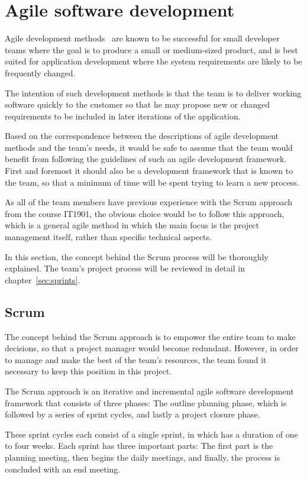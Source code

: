 \section{Agile software development}

Agile development methods~\cite{scrum} are known to be successful for small developer teams where the goal is to produce a small or medium-sized product, and is best suited for application development where the system requirements are likely to be frequently changed.

The intention of such development methods is that the team is to deliver working software quickly to the customer so that he may propose new or changed requirements to be included in later iterations of the application.

Based on the correspondence between the descriptions of agile development methods and the team's needs, it would be safe to assume that the team would benefit from following the guidelines of such an agile development framework. First and foremost it should also be a development framework that is known to the team, so that a minimum of time will be spent trying to learn a new process.

As all of the team members have previous experience with the Scrum approach from the course IT1901, the obvious choice would be to follow this approach, which is a general agile method in which the main focus is the project management itself, rather than specific technical aspects. 

In this section, the concept behind the Scrum process will be thoroughly explained. The team's project process will be reviewed in detail in chapter~\ref{sec:sprints}.

\subsection{Scrum}
The concept behind the Scrum approach is to empower the entire team to make decisions, so that a project manager would become redundant. However, in order to manage and make the best of the team's resources, the team found it necessary to keep this position in this project.

The Scrum approach is an iterative and incremental agile software development framework that consists of three phases: The outline planning phase, which is followed by a series of sprint cycles, and lastly a project closure phase.

These sprint cycles each consist of a single sprint, in which has a duration of one to four weeks. Each sprint has three important parts:
The first part is the planning meeting, then begins the daily  meetings, and finally, the process is concluded with an end meeting.



